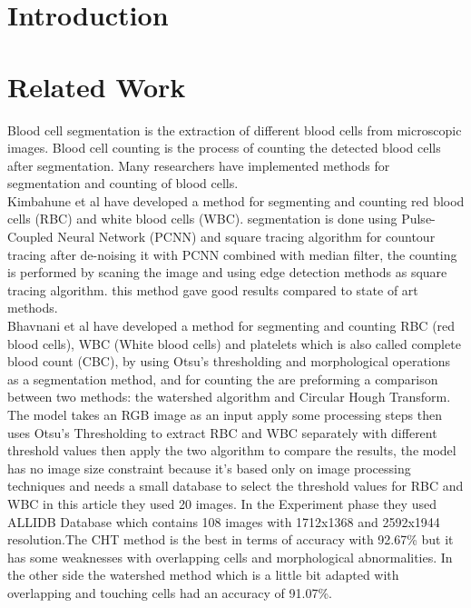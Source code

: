 \section{Introduction}
\vspace{0.2in}
\hspace*{0.16in}

\section{Related Work}
\vspace{0.2in}
\hspace*{0.16in}
Blood cell segmentation is the extraction of different blood cells from microscopic images. Blood cell counting is the process of counting the detected blood cells after segmentation. Many researchers have implemented methods for segmentation and counting of blood cells.\\

Kimbahune et al \textsuperscript{\cite{kimbahune2011blood}} have developed a method for segmenting and counting red blood cells (RBC) and white blood cells (WBC).
segmentation is done using Pulse-Coupled Neural Network (PCNN) and square tracing algorithm for countour tracing after de-noising it with PCNN combined with median filter, the counting is performed by scaning the image and using edge detection methods as square tracing algorithm. this method gave good results compared to state of art methods.\\

Bhavnani et al \textsuperscript{\cite{bhavnani2016segmentation}} have developed a method for segmenting and counting RBC (red blood cells), WBC (White blood cells) and platelets which is also called complete blood count (CBC), by using Otsu’s thresholding and morphological operations as a segmentation method, and for counting the are preforming a comparison between two methods: the watershed algorithm and Circular Hough Transform. The model takes an RGB image as an input apply some processing steps then uses Otsu's Thresholding to extract RBC and WBC separately with different threshold values then apply the two algorithm to compare the results, the model has no image size constraint because it's based only on image processing techniques and needs a small database to select the threshold values for RBC and WBC in this article they used 20 images. In the Experiment phase they used ALLIDB Database which contains 108 images with 1712x1368 and 2592x1944 resolution.The CHT method is the best in terms of accuracy with 92.67\% but it has some weaknesses with overlapping cells and morphological abnormalities. In the other side the watershed method which is a little bit adapted with overlapping and touching cells had an accuracy of 91.07\%.\\

